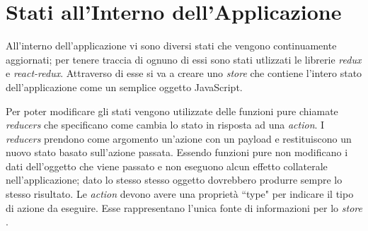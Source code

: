 \section{Stati all'Interno dell'Applicazione}
All'interno dell'applicazione vi sono diversi stati che vengono continuamente aggiornati; per tenere traccia di ognuno di essi sono stati utlizzati le librerie \textit{redux} e \textit{react-redux}.
Attraverso di esse si va a creare uno \textit{store} che contiene l'intero stato dell'applicazione come un semplice oggetto JavaScript.

Per poter modificare gli stati vengono utilizzate delle funzioni pure chiamate
\textit{reducers} che specificano come cambia lo stato in risposta ad una \textit{action}. I \textit{reducers} prendono come argomento un'azione con un payload e restituiscono un nuovo stato basato sull'azione passata. Essendo funzioni pure non modificano i dati
dell'oggetto che viene passato e non eseguono alcun effetto collaterale nell'applicazione; dato lo stesso stesso oggetto dovrebbero produrre sempre lo stesso risultato.
Le \textit{action} devono avere una propriet\`a ``type" per indicare il tipo di azione da eseguire. Esse rappresentano l'unica fonte di informazioni per lo \textit{store} \cite{ReduxSite}.

